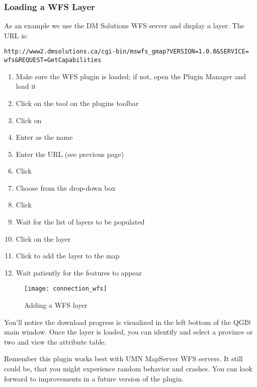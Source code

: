 \subsubsection{Loading a WFS Layer}

As an example we use the DM Solutions WFS server and display a layer. The URL is:
\begin{verbatim}
http://www2.dmsolutions.ca/cgi-bin/mswfs_gmap?VERSION=1.0.0&SERVICE=
wfs&REQUEST=GetCapabilities
\end{verbatim}

\begin{enumerate}
  \item Make sure the WFS plugin is loaded; if not, open the Plugin Manager and load it
  \item Click on the 
  tool on the plugins toolbar
  \item Click on  
  \item Enter  as the name
  \item Enter the URL (see previous page)
  \item Click  
  \item Choose  from the drop-down box
  \item Click  
  \item Wait for the list of layers to be populated
  \item Click on the  layer
  \item Click  to add the layer to the map
  \item Wait patiently for the features to appear
\end{enumerate}

\begin{figure}[ht]
  \begin{center}
  	\caption{Adding a WFS layer \nixcaption}\label{fig:wfs_dmsolutions}
	\texttt{[image: connection\_wfs]}
  \end{center}
\end{figure}

You'll notice the download progress is visualized in the left bottom of the QGIS main window. 
Once the layer is loaded, you can identify and select a province or two and view the 
attribute table.

Remember this plugin works best with UMN MapServer WFS servers. It still
could be, that you might experience random behavior 
and crashes. You can look forward to improvements in a future version of the plugin.

\begin{Tip}[ht]\caption{\textsc{Finding WMS and WFS Servers}}
\end{Tip} 

